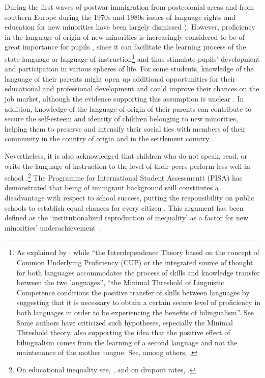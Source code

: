 \documentclass[output=paper,colorlinks,citecolor=brown]{langscibook}
\begin{document}
During the first waves of postwar immigration from postcolonial areas and from southern Europe during the 1970s and 1980s issues of language rights and education for new minorities have been largely dismissed \citep{twitchin_demuth1985,verma_bagley1979,Ager1996LanguagePolicy}). However, proficiency in the language of origin of new minorities is increasingly considered to be of great importance for pupils \citep{eurydice2009}, since it can facilitate the learning process of the state language or language of instruction\footnote{As explained by \citet{medda-windischer2009}: while ``the Interdependence Theory based on the concept of Common Underlying Proficiency (CUP) or the integrated source of thought for both languages accommodates the process of skills and knowledge transfer between the two languages'', ``the Minimal Threshold of Linguistic Competence conditions the positive transfer of skills between languages by suggesting that it is necessary to obtain a certain secure level of proficiency in both languages in order to be experiencing the benefits of bilingualism''. See \citet{cummins1976,cummins1978,cummins1991,cummins2000}. Some authors have criticized such hypotheses, especially the Minimal Threshold theory, also supporting the idea that the positive effect of bilingualism comes from the learning of a second language and not the maintenance of the mother tongue. See, among others, \citet{esser2012}.} and thus stimulate pupils' development and participation in various spheres of life. For some students, knowledge of the language of their parents might open up additional opportunities for their educational and professional development and could improve their chances on the job market, although the evidence supporting this assumption is unclear \citep{pendakur_pendakur2002}. In addition, knowledge of the language of origin of their parents can contribute to secure the self-esteem and identity of children belonging to new minorities, helping them to preserve and intensify their social ties with members of their community in the country of origin and in the settlement country \citep{bankston_zhou1995,eurydice2009,zhang2008}.

Nevertheless, it is also acknowledged that children who do not speak, read, or write the language of instruction to the level of their peers perform less well in school \citep{oecd2001}.\footnote{On educational inequality see, \citet{baysu_devalk2012,heath2008,phalet_heath2011,entorf_minoiu2005,levels_dronkers2008,oecd2006}, and on dropout rates, \citet{kalmijn_kraaykamp2003}.} The Programme for International Student Assessmentt (PISA) has demonstrated that being of immigrant background still constitutes a disadvantage with respect to school success, putting the responsibility on public schools to establish equal chances for every citizen \citep{mehlem_maas_schroeder2004,christensen_stanat2007}. This argument has been defined as the `institutionalized reproduction of inequality' as a factor for new minorities' underachievement \citep{marko2013,radtke_gomolla2002,vertovec_wessendorf2005}.
\end{document}
